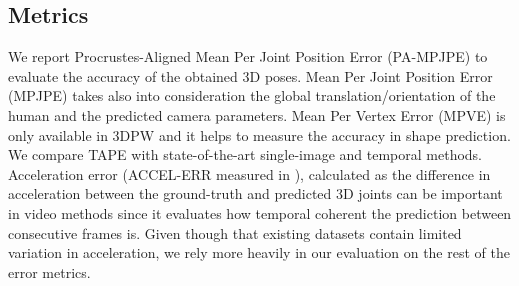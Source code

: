 \documentclass[runningheads]{llncs}
\begin{document}
\subsection{Metrics}
We report Procrustes-Aligned Mean Per Joint
Position Error (PA-MPJPE) to evaluate the accuracy of the obtained 3D poses. Mean Per Joint Position Error (MPJPE) takes also into consideration the global translation/orientation of the human and the predicted camera parameters. Mean Per
Vertex Error (MPVE) is only available in 3DPW and it helps to measure the accuracy in shape prediction. 
We compare TAPE with state-of-the-art single-image and temporal methods. Acceleration error (ACCEL-ERR measured in ), calculated as the difference in acceleration between the ground-truth and predicted 3D joints can be important in video methods since it evaluates how temporal coherent the prediction between consecutive frames is. Given though that existing datasets contain limited variation in acceleration, we rely more heavily in our evaluation on the rest of the error metrics.
\end{document}
